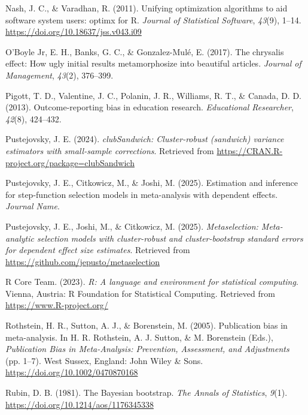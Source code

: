 \documentclass[
  american,
  man, donotrepeattitle,floatsintext]{apa7}
\newlength{\cslhangindent}
\newenvironment{CSLReferences}[2] %
 {\begin{list}{}{%
  \setlength{\itemindent}{0pt}
  \setlength{\leftmargin}{0pt}
  \setlength{\parsep}{0pt}
  \ifodd #1
   \setlength{\leftmargin}{\cslhangindent}
   \setlength{\itemindent}{-1\cslhangindent}
  \fi
  \setlength{\itemsep}{#2\baselineskip}}}
 {\end{list}}
\begin{document}
\begin{CSLReferences}{1}{0}
Nash, J. C., \& Varadhan, R. (2011). Unifying optimization algorithms to aid software system users: {optimx} for {R}. \emph{Journal of Statistical Software}, \emph{43}(9), 1--14. \url{https://doi.org/10.18637/jss.v043.i09}

O'Boyle Jr, E. H., Banks, G. C., \& Gonzalez-Mulé, E. (2017). The chrysalis effect: How ugly initial results metamorphosize into beautiful articles. \emph{Journal of Management}, \emph{43}(2), 376--399.

Pigott, T. D., Valentine, J. C., Polanin, J. R., Williams, R. T., \& Canada, D. D. (2013). Outcome-reporting bias in education research. \emph{Educational Researcher}, \emph{42}(8), 424--432.

Pustejovsky, J. E. (2024). \emph{clubSandwich: Cluster-robust (sandwich) variance estimators with small-sample corrections}. Retrieved from \url{https://CRAN.R-project.org/package=clubSandwich}

Pustejovsky, J. E., Citkowicz, M., \& Joshi, M. (2025). Estimation and inference for step-function selection models in meta-analysis with dependent effects. \emph{Journal Name}.

Pustejovsky, J. E., Joshi, M., \& Citkowicz, M. (2025). \emph{Metaselection: Meta-analytic selection models with cluster-robust and cluster-bootstrap standard errors for dependent effect size estimates}. Retrieved from \url{https://github.com/jepusto/metaselection}

R Core Team. (2023). \emph{R: A language and environment for statistical computing}. Vienna, Austria: R Foundation for Statistical Computing. Retrieved from \url{https://www.R-project.org/}

Rothstein, H. R., Sutton, A. J., \& Borenstein, M. (2005). Publication bias in meta-analysis. In H. R. Rothstein, A. J. Sutton, \& M. Borenstein (Eds.), \emph{Publication {Bias} in {Meta-Analysis}: {Prevention}, {Assessment}, and {Adjustments}} (pp. 1--7). {West Sussex, England}: {John Wiley \& Sons}. \url{https://doi.org/10.1002/0470870168}

Rubin, D. B. (1981). The {Bayesian} bootstrap. \emph{The Annals of Statistics}, \emph{9}(1). \url{https://doi.org/10.1214/aos/1176345338}


\end{CSLReferences}
\end{document}
